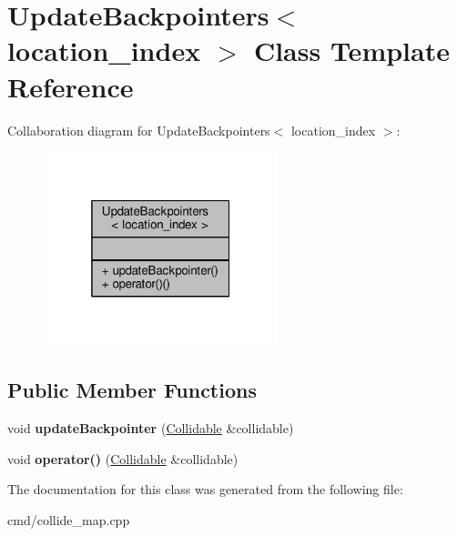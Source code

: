 \hypertarget{classUpdateBackpointers}{}\section{Update\+Backpointers$<$ location\+\_\+index $>$ Class Template Reference}
\label{classUpdateBackpointers}


Collaboration diagram for Update\+Backpointers$<$ location\+\_\+index $>$\+:
\nopagebreak
\begin{figure}[H]
\begin{center}
\leavevmode
\includegraphics[width=193pt]{d3/d01/classUpdateBackpointers__coll__graph}
\end{center}
\end{figure}
\subsection*{Public Member Functions}
\begin{DoxyCompactItemize}
\item 
void {\bfseries update\+Backpointer} (\hyperlink{classCollidable}{Collidable} \&collidable)\hypertarget{classUpdateBackpointers_ac162e83fe16cf20d156c1cba712c70b0}{}\label{classUpdateBackpointers_ac162e83fe16cf20d156c1cba712c70b0}

\item 
void {\bfseries operator()} (\hyperlink{classCollidable}{Collidable} \&collidable)\hypertarget{classUpdateBackpointers_a87d54523c38f11b876d98e72378505e5}{}\label{classUpdateBackpointers_a87d54523c38f11b876d98e72378505e5}

\end{DoxyCompactItemize}


The documentation for this class was generated from the following file\+:\begin{DoxyCompactItemize}
\item 
cmd/collide\+\_\+map.\+cpp\end{DoxyCompactItemize}
